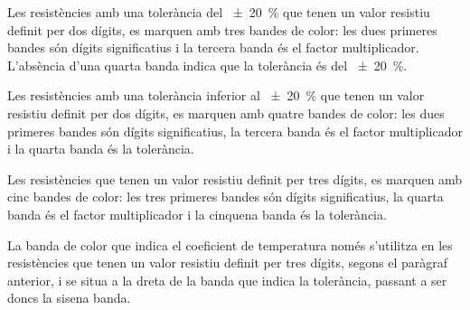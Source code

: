 Les resistències amb una tolerància del \qty{\pm 20}{\percent} que tenen un valor resistiu  definit per dos dígits, es marquen amb tres bandes de color: les dues primeres bandes són dígits significatius i la tercera banda és el factor multiplicador. L'absència d'una quarta banda indica que la tolerància és del  \qty{\pm 20}{\percent}.

Les resistències amb una tolerància inferior al \qty{\pm 20}{\percent} que tenen un valor resistiu  definit per dos dígits, es marquen amb quatre bandes de color: les dues primeres bandes són dígits significatius, la tercera banda és el factor multiplicador i la quarta banda és la tolerància.

Les resistències que tenen un valor resistiu  definit per tres dígits, es marquen amb cinc bandes de color: les tres primeres bandes són dígits significatius, la quarta banda és el factor multiplicador i la cinquena banda és la tolerància.

La banda de color que indica el coeficient de temperatura només s'utilitza en les resistències  que tenen un valor resistiu  definit per tres dígits, segons el paràgraf anterior, i se situa a la dreta de la banda que indica la tolerància, passant a ser doncs la sisena banda.

